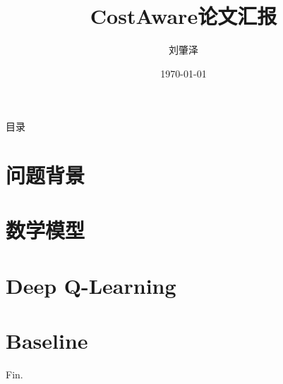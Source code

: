 \documentclass[aspectratio=169]{beamer}
\title{CostAware论文汇报}
\author{刘肇泽}
\institute{控制与计算机工程学院}
\date{\today}
\begin{document}
\begin{frame}[noframenumbering]

    \titlepage

\end{frame}

\begin{frame}{目录}

    \centering
    \begin{minipage}{0.8\textwidth}
        \tableofcontents
    \end{minipage}

\end{frame}

\section{问题背景}



\section{数学模型}



\section{Deep Q-Learning}



\section{Baseline}




\begin{frame}

    \centering
    \Huge
    Fin.

\end{frame}
\end{document}
